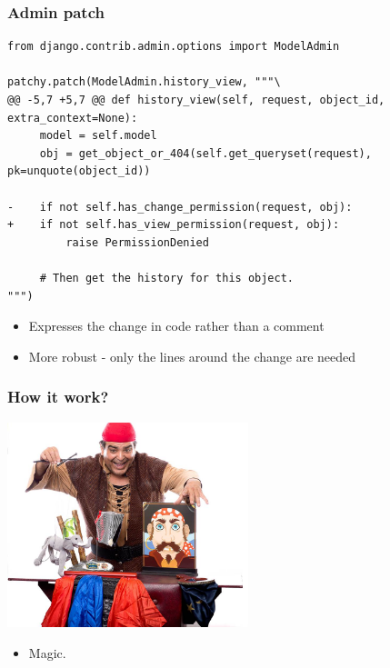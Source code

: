 \documentclass{beamer}
\begin{document}
\begin{frame}[fragile]\frametitle{Admin patch}

    \begin{lstlisting}
from django.contrib.admin.options import ModelAdmin

patchy.patch(ModelAdmin.history_view, """\
@@ -5,7 +5,7 @@ def history_view(self, request, object_id, extra_context=None):
     model = self.model
     obj = get_object_or_404(self.get_queryset(request), pk=unquote(object_id))

-    if not self.has_change_permission(request, obj):
+    if not self.has_view_permission(request, obj):
         raise PermissionDenied

     # Then get the history for this object.
""")
    \end{lstlisting}

    \begin{itemize}
        \item Expresses the change in code rather than a comment
        \item More robust - only the lines around the change are needed
    \end{itemize}

\end{frame}


\begin{frame}[fragile]\frametitle{How it work?}

    \begin{center}
        \includegraphics[width=7cm]{magical-pirate}
    \end{center}

    \begin{itemize}
        \item Magic.
    \end{itemize}

\end{frame}
\end{document}
